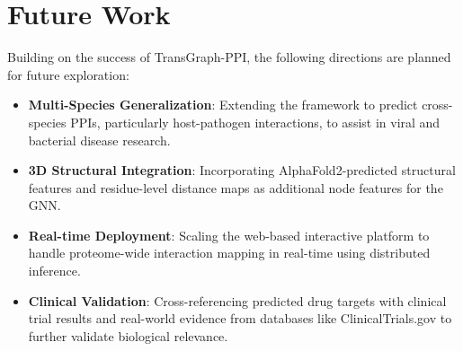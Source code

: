 \documentclass[12pt,a4paper]{report}
\begin{document}
\section{Future Work}
Building on the success of TransGraph-PPI, the following directions are planned for future exploration:
\begin{itemize}
    \item \textbf{Multi-Species Generalization}: Extending the framework to predict cross-species PPIs, particularly host-pathogen interactions, to assist in viral and bacterial disease research.
    \item \textbf{3D Structural Integration}: Incorporating AlphaFold2-predicted structural features and residue-level distance maps as additional node features for the GNN.
    \item \textbf{Real-time Deployment}: Scaling the web-based interactive platform to handle proteome-wide interaction mapping in real-time using distributed inference.
    \item \textbf{Clinical Validation}: Cross-referencing predicted drug targets with clinical trial results and real-world evidence from databases like ClinicalTrials.gov to further validate biological relevance.
\end{itemize}
\end{document}
